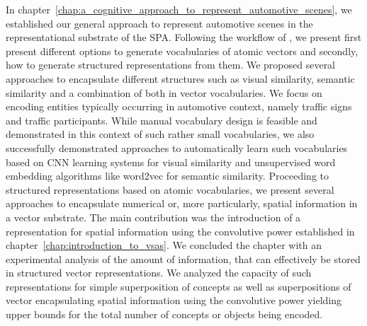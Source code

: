 In chapter~\ref{chap:a_cognitive_approach_to_represent_automotive_scenes}, we established our general approach to represent automotive scenes in the representational substrate of the \ac{SPA}.
Following the workflow of \textcite{Gallant2013}, we present first present different options to generate vocabularies of atomic vectors and secondly, how to generate structured representations from them. 
We proposed several approaches to encapsulate different structures such as visual similarity, semantic similarity and a combination of both in vector vocabularies.
We focus on encoding entities typically occurring in automotive context, namely traffic signs and traffic participants.
While manual vocabulary design is feasible and demonstrated in this context of such rather small vocabularies, we also successfully demonstrated approaches to automatically learn such vocabularies based on \ac{CNN} learning systems for visual similarity and unsupervised word embedding algorithms like word2vec for semantic similarity.
Proceeding to structured representations based on atomic vocabularies, we present several approaches to encapsulate numerical or, more particularly, spatial information in a vector substrate.
The main contribution was the introduction of a representation for spatial information using the convolutive power established in chapter~\ref{chap:introduction_to_vsas}.
We concluded the chapter with an experimental analysis of the amount of information, that can effectively be stored in structured vector representations.
We analyzed the capacity of such representations for simple superposition of concepts as well as superpositions of vector encapsulating spatial information using the convolutive power yielding upper bounds for the total number of concepts or objects being encoded.
 
